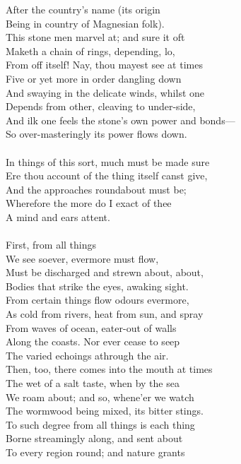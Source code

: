 After the country's name (its origin\\
Being in country of Magnesian folk).\\
This stone men marvel at; and sure it oft\\
Maketh a chain of rings, depending, lo,\\
From off itself! Nay, thou mayest see at times\\
Five or yet more in order dangling down\\
And swaying in the delicate winds, whilst one\\
Depends from other, cleaving to under-side,\\
And ilk one feels the stone's own power and bonds—\\
So over-masteringly its power flows down.\\
\\
In things of this sort, much must be made sure\\
Ere thou account of the thing itself canst give,\\
And the approaches roundabout must be;\\
Wherefore the more do I exact of thee\\
A mind and ears attent.\\
\\
First, from all things\\
We see soever, evermore must flow,\\
Must be discharged and strewn about, about,\\
Bodies that strike the eyes, awaking sight.\\
From certain things flow odours evermore,\\
As cold from rivers, heat from sun, and spray\\
From waves of ocean, eater-out of walls\\
Along the coasts. Nor ever cease to seep\\
The varied echoings athrough the air.\\
Then, too, there comes into the mouth at times\\
The wet of a salt taste, when by the sea\\
We roam about; and so, whene'er we watch\\
The wormwood being mixed, its bitter stings.\\
To such degree from all things is each thing\\
Borne streamingly along, and sent about\\
To every region round; and nature grants\\
